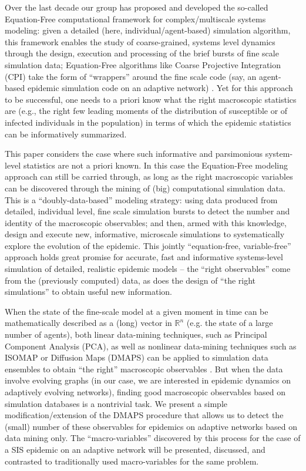 Over the last decade our group has proposed and developed the
so-called Equation-Free computational framework for complex/multiscale
systems modeling: given a detailed (here, individual/agent-based)
simulation algorithm, this framework enables the study of
coarse-grained, systems level dynamics through the design, execution
and processing of the brief bursts of fine scale simulation data;
Equation-Free algorithms like Coarse Projective Integration (CPI) take
the form of “wrappers” around the fine scale code (say, an agent-based
epidemic simulation code on an adaptive network)
\cite{gear_equation-free_2003,kevrekidis_equation-free:_2004,tsoumanis_coarse-graining_2012,siettos_equation-free_2011}. Yet
for this approach to be successful, one needs to a priori know what
the right macroscopic statistics are (e.g., the right few leading
moments of the distribution of susceptible or of infected individuals
in the population) in terms of which the epidemic statistics can be
informatively summarized.

This paper considers the case where such informative and parsimonious
system-level statistics are not a priori known.  In this case the
Equation-Free modeling approach can still be carried through, as long
as the right macroscopic variables can be discovered through the
mining of (big) computational simulation data. This is a
“doubly-data-based” modeling strategy: using data produced from
detailed, individual level, fine scale simulation bursts to detect the
number and identity of the macroscopic observables; and then, armed
with this knowledge, design and execute new, informative, microscale
simulations to systematically explore the evolution of the
epidemic. This jointly “equation-free, variable-free” approach holds
great promise for accurate, fast and informative systems-level
simulation of detailed, realistic epidemic models – the “right
observables” come from the (previously computed) data, as does the
design of “the right simulations” to obtain useful new information.


When the state of the fine-scale model at a given moment in time can
be mathematically described as a (long) vector in $\mathbb{R}^n$
(e.g. the state of a large number of agents), both linear data-mining
techniques, such as Principal Component Analysis (PCA), as well as
nonlinear data-mining techniques such as ISOMAP or Diffusion Maps
(DMAPS) can be applied to simulation data ensembles to obtain “the
right” macroscopic observables
\cite{jolliffe_principal_2014,coifman_diffusion_2006,tenenbaum_global_2000}. But
when the data involve evolving graphs (in our case, we are interested
in epidemic dynamics on adaptively evolving networks), finding good
macroscopic observables based on simulation databases is a nontrivial
task. We present a simple modification/extension of the DMAPS
procedure that allows us to detect the (small) number of these
observables for epidemics on adaptive networks based on data mining
only.  The “macro-variables” discovered by this process for the case
of a SIS epidemic on an adaptive network will be presented, discussed,
and contrasted to traditionally used macro-variables for the same
problem.

